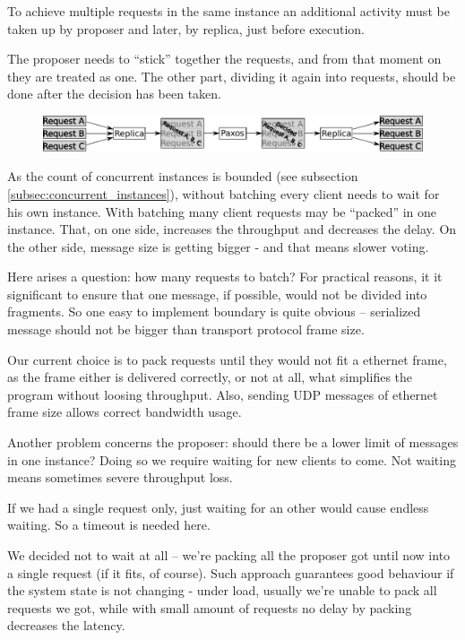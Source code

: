 To achieve multiple requests in the same instance an additional activity must be taken up by proposer and later, by replica, just before execution.

The proposer needs to ``stick'' together the requests, and from that moment on they are treated as one. The other part, dividing it again into requests, should be done after the decision has been taken.
\begin{figure}[h]
\includegraphics[keepaspectratio, width=\textwidth]{features/batching.pdf}
\end{figure}

As the count of concurrent instances is bounded (see subsection \ref{subsec:concurrent_instances}), without batching every client needs to wait for his own instance. With batching many client requests may be ``packed'' in one instance. That, on one side, increases the throughput and decreases the delay.
On the other side, message size is getting bigger - and that means slower voting.

Here arises a question: how many requests to batch? For practical reasons, it it significant to ensure that one message, if possible, would not be divided into fragments. So one easy to implement boundary is quite obvious -- serialized message should not be bigger than transport protocol frame size.

Our current choice is to pack requests until they would not fit a ethernet frame, as the frame either is delivered correctly, or not at all, what simplifies the program without loosing throughput. Also, sending UDP messages of ethernet frame size allows correct bandwidth usage.

Another problem concerns the proposer: should there be a lower limit of messages in one instance? Doing so we require waiting for new clients to come. Not waiting means sometimes severe throughput loss.

If we had a single request only, just waiting for an other would cause endless waiting. So a timeout is needed here.

We decided not to wait at all -- we're packing all the proposer got until now into a single request (if it fits, of course). Such approach guarantees good behaviour if the system state is not changing - under load, usually we're unable to pack all requests we got, while with small amount of requests no delay by packing decreases the latency.
